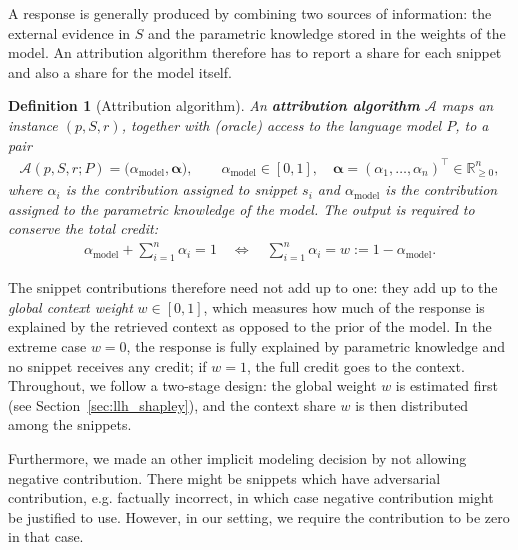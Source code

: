 \documentclass{article}
\newtheorem{definition}[theorem]{Definition}
\begin{document}
A response is generally produced by combining two sources of information: the external evidence in $S$ and the parametric knowledge stored in the weights of the model. An attribution algorithm therefore has to report a share for each snippet and also a share for the model itself.

\begin{definition}[Attribution algorithm]\label{def:attribution_algorithm}
An \textbf{attribution algorithm} $\mathcal{A}$ maps an instance $(p, S, r)$, together with (oracle) access to the language model $P$, to a pair
\begin{align}
    \mathcal{A}(p, S, r; P) = \big(\alpha_{\text{model}}, \boldsymbol{\alpha}\big), \qquad \alpha_{\text{model}} \in [0, 1], \quad \boldsymbol{\alpha} = (\alpha_1, \dots, \alpha_n)^\top \in \mathbb{R}^n_{\ge 0},
\end{align}
where $\alpha_i$ is the contribution assigned to snippet $s_i$ and $\alpha_{\text{model}}$ is the contribution assigned to the parametric knowledge of the model. The output is required to conserve the total credit:
\begin{align}\label{eq:model_contribution}
    \alpha_{\text{model}} + \sum_{i=1}^n \alpha_i = 1 \quad \Longleftrightarrow \quad \sum_{i=1}^n \alpha_i = w := 1 - \alpha_{\text{model}} .
\end{align}
\end{definition}

The snippet contributions therefore need not add up to one: they add up to the \emph{global context weight} $w \in [0,1]$, which measures how much of the response is explained by the retrieved context as opposed to the prior of the model. In the extreme case $w = 0$, the response is fully explained by parametric knowledge and no snippet receives any credit; if $w = 1$, the full credit goes to the context. Throughout, we follow a two-stage design: the global weight $w$ is estimated first (see Section~\ref{sec:llh_shapley}), and the context share $w$ is then distributed among the snippets.

Furthermore, we made an other implicit modeling decision by not allowing negative contribution. There might be snippets which have adversarial contribution, e.g. factually incorrect, in which case negative contribution might be justified to use. However, in our setting, we require the contribution to be zero in that case.

\end{document}
